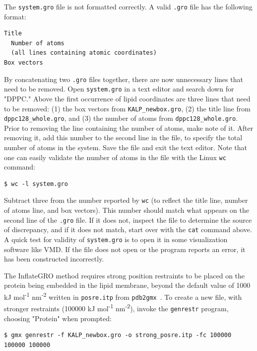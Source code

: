 \documentclass[9pt,tutorial,pubversion]{livecoms}
\begin{document}
The \texttt{system.gro} file is not formatted correctly. A valid \texttt{.gro} file has the following format:

\begin{lstlisting}
Title
  Number of atoms
  (all lines containing atomic coordinates)
Box vectors
\end{lstlisting}

By concatenating two \texttt{.gro} files together, there are now unnecessary lines that need to be removed. Open \texttt{system.gro} in a text editor and search down for "DPPC." Above the first occurrence of lipid coordinates are three lines that need to be removed: (1) the box vectors from \texttt{KALP\_newbox.gro}, (2) the title line from \texttt{dppc128\_whole.gro}, and (3) the number of atoms from \texttt{dppc128\_whole.gro}. Prior to removing the line containing the number of atoms, make note of it. After removing it, add this number to the second line in the file, to specify the total number of atoms in the system. Save the file and exit the text editor. Note that one can easily validate the number of atoms in the file with the Linux \texttt{wc} command:

\begin{lstlisting}
$ wc -l system.gro
\end{lstlisting}

Subtract three from the number reported by \texttt{wc} (to reflect the title line, number of atoms line, and box vectors). This number should match what appears on the second line of the \texttt{.gro} file. If it does not, inspect the file to determine the source of discrepancy, and if it does not match, start over with the \texttt{cat} command above. A quick test for validity of \texttt{system.gro} is to open it in some visualization software like VMD. If the file does not open or the program reports an error, it has been constructed incorrectly.

The InflateGRO method requires strong position restraints to be placed on the protein being embedded in the lipid membrane, beyond the default value of 1000 kJ mol\textsuperscript{-1} nm\textsuperscript{-2} written in \texttt{posre.itp} from \texttt{pdb2gmx}~\cite{Kandt2007}. To create a new file, with stronger restraints (100000 kJ mol\textsuperscript{-1} nm\textsuperscript{-2}), invoke the \texttt{genrestr} program, choosing "Protein" when prompted:

\begin{lstlisting}
$ gmx genrestr -f KALP_newbox.gro -o strong_posre.itp -fc 100000 100000 100000
\end{lstlisting}
\end{document}
